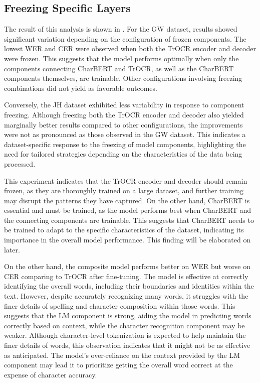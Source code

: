 \subsection{Freezing Specific Layers}
\label{subsec:5_freezing_specific_layers}
The result of this analysis is shown in . For the GW dataset, results showed significant variation depending on the configuration of frozen components. The lowest WER and CER were observed when both the TrOCR encoder and decoder were frozen. This suggests that the model performs optimally when only the components connecting CharBERT and TrOCR, as well as the CharBERT components themselves, are trainable. Other configurations involving freezing combinations did not yield as favorable outcomes.

Conversely, the JH dataset exhibited less variability in response to component freezing. Although freezing both the TrOCR encoder and decoder also yielded marginally better results compared to other configurations, the improvements were not as pronounced as those observed in the GW dataset. This indicates a dataset-specific response to the freezing of model components, highlighting the need for tailored strategies depending on the characteristics of the data being processed.

This experiment indicates that the TrOCR encoder and decoder should remain frozen, as they are thoroughly trained on a large dataset, and further training may disrupt the patterns they have captured. On the other hand, CharBERT is essential and must be trained, as the model performs best when CharBERT and the connecting components are trainable. This suggests that CharBERT needs to be trained to adapt to the specific characteristics of the dataset, indicating its importance in the overall model performance. This finding will be elaborated on later.

On the other hand, the composite model performs better on WER but worse on CER comparing to TrOCR after fine-tuning. The model is effective at correctly identifying the overall words, including their boundaries and identities within the text. However, despite accurately recognizing many words, it struggles with the finer details of spelling and character composition within those words. This suggests that the LM component is strong, aiding the model in predicting words correctly based on context, while the character recognition component may be weaker. Although character-level tokenization is expected to help maintain the finer details of words, this observation indicates that it might not be as effective as anticipated. The model's over-reliance on the context provided by the LM component may lead it to prioritize getting the overall word correct at the expense of character accuracy.


